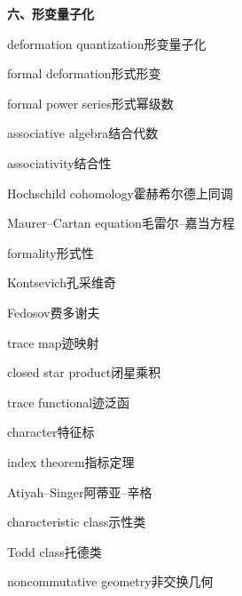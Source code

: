\filbreak
\vspace{0.9em}
\noindent\textbf{六、形变量子化}\par\nobreak\vspace{0.35em}
\begin{multicols}{2}
\raggedright
\setlength{\parindent}{0pt}
\setlength{\parskip}{0.16em}
\linespread{1.02}\selectfont
deformation quantization\hspace{0.9em}形变量子化\par
formal deformation\hspace{0.9em}形式形变\par
formal power series\hspace{0.9em}形式幂级数\par
associative algebra\hspace{0.9em}结合代数\par
associativity\hspace{0.9em}结合性\par
Hochschild cohomology\hspace{0.9em}霍赫希尔德上同调\par
Maurer–Cartan equation\hspace{0.9em}毛雷尔–嘉当方程\par
formality\hspace{0.9em}形式性\par
Kontsevich\hspace{0.9em}孔采维奇\par
Fedosov\hspace{0.9em}费多谢夫\par
trace map\hspace{0.9em}迹映射\par
closed star product\hspace{0.9em}闭星乘积\par
trace functional\hspace{0.9em}迹泛函\par
character\hspace{0.9em}特征标\par
index theorem\hspace{0.9em}指标定理\par
Atiyah–Singer\hspace{0.9em}阿蒂亚–辛格\par
characteristic class\hspace{0.9em}示性类\par
Todd class\hspace{0.9em}托德类\par
noncommutative geometry\hspace{0.9em}非交换几何\par

\end{multicols}
